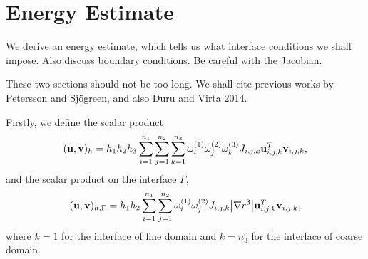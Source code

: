 \documentclass[a4paper]{article}
\begin{document}
\section{Energy Estimate}
We derive an energy estimate, which tells us what interface conditions we shall impose. Also discuss boundary conditions. Be careful with the Jacobian.

These two sections should not be too long. We shall cite previous works by Petersson and Sjögreen, and also Duru and Virta 2014. 

Firstly, we define the scalar product 
\begin{equation*}
({\bf u}, {\bf v})_h = h_1h_2h_3\sum_{i=1}^{n_1}\sum_{j=1}^{n_2}\sum_{k=1}^{n_3}\omega_i^{(1)}\omega_j^{(2)}\omega_k^{(3)}J_{i,j,k}{\bf u}^{T}_{i,j,k}{\bf v}_{i,j,k},
\end{equation*}
and the scalar product on the interface $\Gamma$,
\begin{equation*}
({\bf u}, {\bf v})_{h,\Gamma} = h_1h_2\sum_{i=1}^{n_1}\sum_{j=1}^{n_2}\omega_i^{(1)}\omega_j^{(2)}J_{i,j,k}\big|\nabla r^{3}\big|{\bf u}_{i,j,k}^{T}{\bf v}_{i,j,k},
\end{equation*}
where $k = 1$ for the interface of fine domain and $k = n_3^c$ for the interface of coarse domain.
\end{document}
